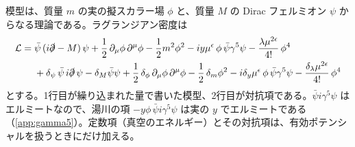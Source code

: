 \documentclass[a4paper,10pt]{ltjsarticle}
\begin{document}
模型は、質量 $m$ の実の擬スカラー場 $\phi$ と、質量 $M$ の Dirac フェルミオン $\psi$ からなる理論である。ラグランジアン密度は
\begin{equation}
\begin{aligned}
\mathcal{L}={}&\bar\psi\,(i\slashed\partial-M)\,\psi+\frac12\,\partial_\mu\phi\,\partial^\mu\phi-\frac12 m^2\phi^2
-iy\mu^{\epsilon}\,\phi\,\bar\psi\gamma^5\psi-\frac{\lambda\mu^{2\epsilon}}{4!}\,\phi^4\\
&+\delta_\psi\,\bar\psi\,i\slashed\partial\,\psi-\delta_M\bar\psi\psi+\frac12\,\delta_\phi\,\partial_\mu\phi\,\partial^\mu\phi-\frac12\,\delta_m\phi^2
-i\delta_y\mu^{\epsilon}\,\phi\,\bar\psi\gamma^5\psi-\frac{\delta_\lambda\mu^{2\epsilon}}{4!}\,\phi^4
\end{aligned}
\label{eq:L}
\end{equation}
とする。1行目が繰り込まれた量で書いた模型、2行目が対抗項である。$\bar\psi i\gamma^5\psi$ はエルミートなので、湯川の項 $-y\phi\,\bar\psi i\gamma^5\psi$ は実の $y$ でエルミートである（\ref{app:gamma5}）。定数項（真空のエネルギー）とその対抗項は、有効ポテンシャルを扱うときにだけ加える。
\end{document}
